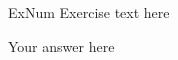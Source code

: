 \documentclass{rutgers_hw}
\author{Firstname Lastname} %
\date{\today} %
\begin{document}
\maketitle



\begin{exercise}{ExNum}
Exercise text here
\end{exercise}
\begin{solution}
Your answer here
\end{solution}
\end{document}
